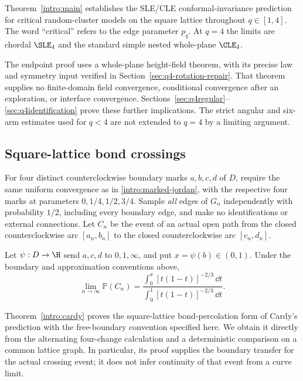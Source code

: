 Theorem~\ref{intro:main} establishes the SLE/CLE conformal-invariance
prediction for critical random-cluster models on the square lattice
throughout $q\in[1,4]$.  The word ``critical'' refers to the edge
parameter $p_q$.  At $q=4$ the limits are chordal $\SLE_4$ and the
standard simple nested whole-plane $\CLE_4$.

The endpoint proof uses a whole-plane height-field theorem, with its
precise law and symmetry input verified in
Section~\ref{sec:q4-rotation-repair}.  That theorem supplies no
finite-domain field convergence, conditional convergence after an
exploration, or interface convergence.  Sections~\ref{sec:q4regular}--
\ref{sec:q4identification} prove these further implications.  The
strict angular and six-arm estimates used for $q<4$ are not extended to
$q=4$ by a limiting argument.

\subsection{Square-lattice bond crossings}
\label{intro:crossings}

For four distinct counterclockwise boundary marks $a,b,c,d$ of $D$,
require the same uniform convergence as in
\eqref{intro:marked-jordan}, with the respective four marks at
parameters $0,1/4,1/2,3/4$.  Sample \emph{all} edges of $G_n$
independently with probability $1/2$, including every boundary edge, and
make no identifications or external connections.  Let $C_n$ be the
event of an actual open path from the closed counterclockwise arc
$[a_n,b_n]$ to the closed counterclockwise arc $[c_n,d_n]$.

\begin{theorem}
\label{intro:cardy}
Let $\psi:D\to\H$ send $a,c,d$ to $0,1,\infty$, and put
$x=\psi(b)\in(0,1)$.  Under the boundary and approximation conventions
above,
\begin{equation}\label{intro:cardy-formula}
 \lim_{n\to\infty}\mathbb P(C_n)
 =\frac{\displaystyle\int_0^x[t(1-t)]^{-2/3}\,\dd t}
        {\displaystyle\int_0^1[t(1-t)]^{-2/3}\,\dd t}.
\end{equation}
\end{theorem}

Theorem~\ref{intro:cardy} proves the square-lattice bond-percolation form
of Cardy's prediction with the free-boundary convention specified here.
We obtain it directly from the alternating four-change calculation and
a deterministic comparison on a common lattice graph.  In particular,
its proof supplies the boundary transfer for the actual crossing event;
it does not infer continuity of that event from a curve limit.

